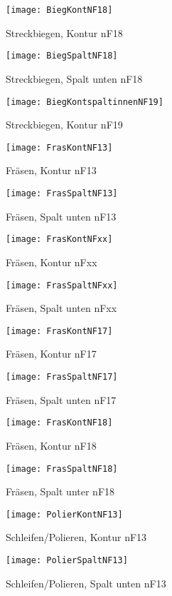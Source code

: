 \documentclass[12pt,a4paper,parskip]{scrartcl}
\begin{document}
\begin{figure}[H]
\centering
\texttt{[image: BiegKontNF18]}
\caption{Streckbiegen, Kontur nF18}
\end{figure}
\begin{figure}[H]
\centering
\texttt{[image: BiegSpaltNF18]}
\caption{Streckbiegen, Spalt unten nF18}
\end{figure}
\begin{figure}[H]
\centering
\texttt{[image: BiegKontspaltinnenNF19]}
\caption{Streckbiegen, Kontur nF19}
\end{figure}
\begin{figure}[H]
\centering
\texttt{[image: FrasKontNF13]}
\caption{Fräsen, Kontur nF13}
\end{figure}
\begin{figure}[H]
\centering
\texttt{[image: FrasSpaltNF13]}
\caption{Fräsen, Spalt unten nF13}
\end{figure}
\begin{figure}[H]
\centering
\texttt{[image: FrasKontNFxx]}
\caption{Fräsen, Kontur nFxx}
\end{figure}
\begin{figure}[H]
\centering
\texttt{[image: FrasSpaltNFxx]}
\caption{Fräsen, Spalt unten nFxx}
\end{figure}
\begin{figure}[H]
\centering
\texttt{[image: FrasKontNF17]}
\caption{Fräsen, Kontur nF17}
\end{figure}
\begin{figure}[H]
\centering
\texttt{[image: FrasSpaltNF17]}
\caption{Fräsen, Spalt unten nF17}
\end{figure}
\begin{figure}[H]
\centering
\texttt{[image: FrasKontNF18]}
\caption{Fräsen, Kontur nF18}
\end{figure}
\begin{figure}[H]
\centering
\texttt{[image: FrasSpaltNF18]}
\caption{Fräsen, Spalt unter nF18}
\end{figure}
\begin{figure}[H]
\centering
\texttt{[image: PolierKontNF13]}
\caption{Schleifen/Polieren, Kontur nF13}
\end{figure}
\begin{figure}[H]
\centering
\texttt{[image: PolierSpaltNF13]}
\caption{Schleifen/Polieren, Spalt unten nF13}
\end{figure}
\end{document}
